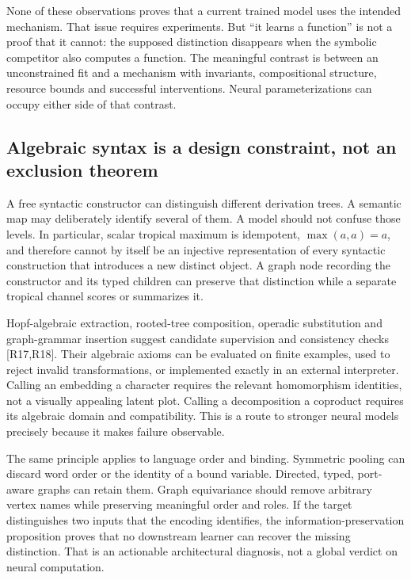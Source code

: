 None of these observations proves that a current trained model uses the intended mechanism. That issue requires experiments. But ``it learns a function'' is not a proof that it cannot: the supposed distinction disappears when the symbolic competitor also computes a function. The meaningful contrast is between an unconstrained fit and a mechanism with invariants, compositional structure, resource bounds and successful interventions. Neural parameterizations can occupy either side of that contrast.

\subsection{Algebraic syntax is a design constraint, not an exclusion theorem}

A free syntactic constructor can distinguish different derivation trees. A semantic map may deliberately identify several of them. A model should not confuse those levels. In particular, scalar tropical maximum is idempotent, $\max(a,a)=a$, and therefore cannot by itself be an injective representation of every syntactic construction that introduces a new distinct object. A graph node recording the constructor and its typed children can preserve that distinction while a separate tropical channel scores or summarizes it.

Hopf-algebraic extraction, rooted-tree composition, operadic substitution and graph-grammar insertion suggest candidate supervision and consistency checks [R17,R18]. Their algebraic axioms can be evaluated on finite examples, used to reject invalid transformations, or implemented exactly in an external interpreter. Calling an embedding a character requires the relevant homomorphism identities, not a visually appealing latent plot. Calling a decomposition a coproduct requires its algebraic domain and compatibility. This is a route to stronger neural models precisely because it makes failure observable.

The same principle applies to language order and binding. Symmetric pooling can discard word order or the identity of a bound variable. Directed, typed, port-aware graphs can retain them. Graph equivariance should remove arbitrary vertex names while preserving meaningful order and roles. If the target distinguishes two inputs that the encoding identifies, the information-preservation proposition proves that no downstream learner can recover the missing distinction. That is an actionable architectural diagnosis, not a global verdict on neural computation.

